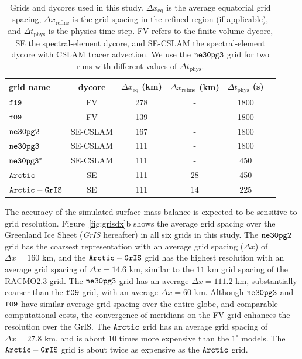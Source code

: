 \documentclass[draft]{agujournal2019}
\begin{document}
 \begin{table}
 \centering
 \scriptsize
 \begin{tabular}{lccccc}
   \hline
   grid name & dycore & $\Delta x_{\mathrm{eq}}$ (km) & $\Delta x_{\mathrm{refine}}$ (km) & $\Delta t_{\mathrm{phys}}$ (s) \\ 
   \hline
   $\tt f19$ & FV & 278 & - &1800 \\
   $\tt f09$ & FV & 139 & - &1800 \\
   $\tt ne30pg2$ & SE-CSLAM & 167 & - & 1800 \\
   $\tt ne30pg3$ & SE-CSLAM & 111 & - & 1800 \\
   $\tt ne30pg3^{*}$ & SE-CSLAM & 111 & - & 450 \\
   $\tt Arctic$ & SE & 111 & 28 & 450 \\
   $\tt Arctic-GrIS$ & SE & 111 & 14 & 225 \\
 \hline
 \end{tabular}
  \caption{Grids and dycores used in this study. $\Delta x_{\mathrm{eq}}$ is the average equatorial grid spacing, $\Delta x_{\mathrm{refine}}$ is the grid spacing in the refined region (if applicable), and $\Delta t_{\mathrm{phys}}$ is the physics time step. FV refers to the finite-volume dycore, SE the spectral-element dycore, and SE-CSLAM the spectral-element dycore with CSLAM tracer advection.  We use the $\tt ne30pg3$ grid for two runs with different values of $\Delta t_{\mathrm{phys}}$.}
 \label{tbl:table1}
 \end{table}

The accuracy of the simulated surface mass balance is expected to be sensitive to grid resolution. Figure~\ref{fig:grisdx}b shows the average grid spacing over the Greenland Ice Sheet (\textit{GrIS} hereafter) in all six grids in this study. The $\tt ne30pg2$ grid has the coarsest representation with an average grid spacing ($\Delta x$) of $\Delta x=160$ km, and the $\tt Arctic-GrIS$ grid has the highest resolution with an average grid spacing of $\Delta x=14.6$ km, similar to the $11$ km grid spacing of the RACMO2.3 grid. The $\tt ne30pg3$ grid has an average $\Delta x=111.2$ km, substantially coarser than the $\tt f09$ grid, with an average $\Delta x=60$ km. Although $\tt ne30pg3$ and $\tt f09$ have similar average grid spacing over the entire globe, and comparable computational costs, the convergence of meridians on the FV grid enhances the resolution over the GrIS. The $\tt Arctic$ grid has an average grid spacing of $\Delta x=27.8$ km, and is about 10 times more expensive than the $1^{\circ}$ models.  The $\tt Arctic-GrIS$ grid is about twice as expensive as the $\tt Arctic$ grid.
\end{document}
